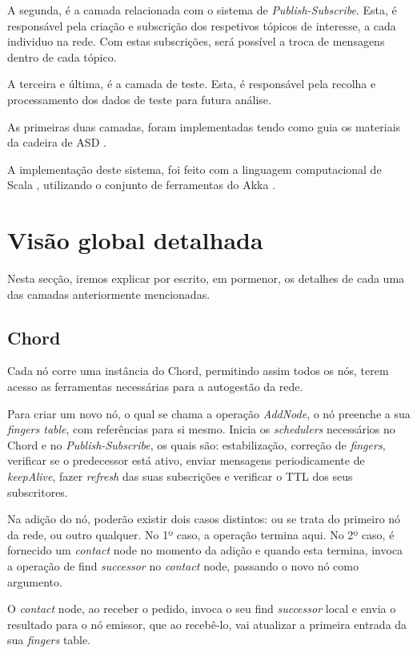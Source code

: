 \documentclass[12pt]{article}
\begin{document}
A segunda, é a camada relacionada com o sistema de \emph{Publish-Subscribe}. Esta, é responsável pela criação e subscrição dos respetivos tópicos de interesse, a cada individuo na rede. Com estas subscrições, será possível a troca de mensagens dentro de cada tópico.

A terceira e última, é a camada de teste. Esta, é responsável pela recolha e processamento dos dados de teste para futura análise.

As primeiras duas camadas, foram implementadas tendo como guia os materiais da cadeira de ASD \cite{b1}.

A implementação deste sistema, foi feito com a linguagem computacional de Scala \cite{b3}, utilizando o conjunto de ferramentas do Akka \cite{b4}.

\newpage
\section{Visão global detalhada}

Nesta secção, iremos explicar por escrito, em pormenor, os detalhes de cada uma das camadas anteriormente mencionadas.

\subsection{Chord}

Cada nó corre uma instância do Chord, permitindo assim todos os nós, terem acesso as ferramentas necessárias para a autogestão da rede.

Para criar um novo nó, o qual se chama a operação \emph{AddNode}, o nó preenche a sua \emph{fingers table}, com referências para si mesmo. Inicia os \emph{schedulers} necessários no Chord e no \emph{Publish-Subscribe}, os quais são: estabilização, correção de \emph{fingers}, verificar se o predecessor está ativo, enviar mensagens periodicamente de \emph{keepAlive}, fazer \emph{refresh} das suas subscrições e verificar o TTL dos seus subscritores.

Na adição do nó, poderão existir dois casos distintos: ou se trata do primeiro nó da rede, ou outro qualquer. No 1º caso, a operação termina aqui. No 2º caso, é fornecido um \emph{contact} node no momento da adição e quando esta termina, invoca a operação de find \emph{successor} no \emph{contact} node, passando o novo nó como argumento.

O \emph{contact} node, ao receber o pedido, invoca o seu find \emph{successor} local e envia o resultado para o nó emissor, que ao recebê-lo, vai atualizar a primeira entrada da sua \emph{fingers} table.
\end{document}
